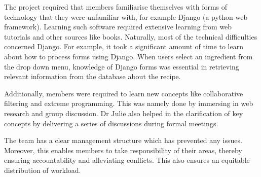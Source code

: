 The project required that members familiarise themselves with forms of technology that they were unfamiliar with, for example Django (a python web framework). Learning such software required extensive learning from web tutorials and other sources like books. Naturally, most of the technical difficulties concerned Django. For example, it took a significant amount of time to learn about how to process forms using Django. When users select an ingredient from the drop down menu, knowledge of Django forms was essential in retrieving relevant information from the database about the recipe. 

Additionally, members were required to learn new concepts like collaborative filtering and extreme programming. This was namely done by immersing in web research and group discussion. Dr Julie also helped in the clarification of key concepts by delivering a series of discussions during formal meetings.

The team has a clear management structure which has prevented any issues. Moreover, this enables members to take responsibility of their areas, thereby ensuring accountability and alleviating conflicts. This also ensures an equitable distribution of workload.
